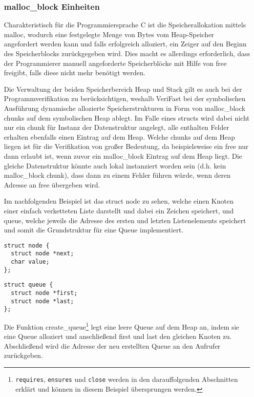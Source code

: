 \subsubsection{malloc\_block Einheiten}

Charakteristisch für die Programmiersprache C ist die Speicherallokation mittels malloc, wodurch eine festgelegte Menge von Bytes vom Heap-Speicher angefordert werden kann und falls erfolgreich alloziert, ein Zeiger auf den Beginn des Speicherblocks zurückgegeben wird. Dies macht es allerdings erforderlich, dass der Programmierer manuell angeforderte Speicherblöcke mit Hilfe von free freigibt, falls diese nicht mehr benötigt werden.

Die Verwaltung der beiden Speicherbereich Heap und Stack gilt es auch bei der Programmverifikation zu berücksichtigen, weshalb VeriFast bei der symbolischen Ausführung dynamische allozierte Speicherstrukturen in Form von malloc\_block chunks auf dem symbolischen Heap ablegt. Im Falle eines structs wird dabei nicht nur ein chunk für Instanz der Datenstruktur angelegt, alle enthalten Felder erhalten ebenfalls einen Eintrag auf dem Heap. Welche chunks auf dem Heap liegen ist für die Verifikation von großer Bedeutung, da beispielsweise ein free nur dann erlaubt ist, wenn zuvor ein malloc\_block Eintrag auf dem Heap liegt. Die gleiche Datenstruktur könnte auch lokal instanziert worden sein (d.h. kein malloc\_block chunk), dass dann zu einem Fehler führen würde, wenn deren Adresse an free übergeben wird.

Im nachfolgenden Beispiel ist das struct node zu sehen, welche einen Knoten einer einfach verketteten Liste darstellt und dabei ein Zeichen speichert, und queue, welche jeweils die Adresse des ersten und letzten Listenelements speichert und somit die Grundstruktur für eine Queue implementiert.

\noindent
\begin{minipage}{.45\textwidth}
\begin{lstlisting}
struct node {
  struct node *next;
  char value;
};
\end{lstlisting}
\end{minipage}
\hfill
\begin{minipage}{.45\textwidth}
\begin{lstlisting}
struct queue {
  struct node *first;
  struct node *last;
};
\end{lstlisting}
\end{minipage}

\noindent
Die Funktion create\_queue\footnote{\texttt{requires}, \texttt{ensures} und \texttt{close} werden in den darauffolgenden Abschnitten erklärt und können in diesem Beispiel übersprungen werden.} legt eine leere Queue auf dem Heap an, indem sie eine Queue alloziert und anschließend first und last den gleichen Knoten zu. Abschließend wird die Adresse der neu erstellten Queue an den Aufrufer zurückgeben.

